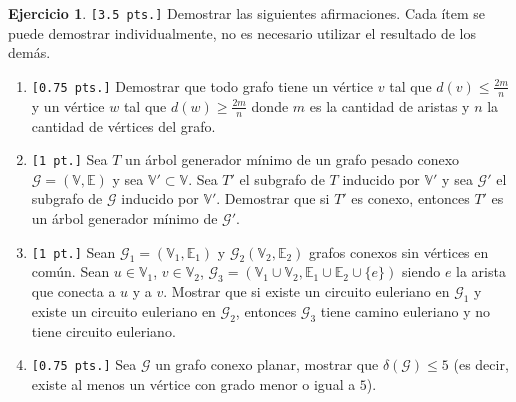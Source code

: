 \documentclass[a4paper,oneside,12pt]{amsart}
\theoremstyle{definition}
\newtheorem{quest}{Ejercicio}
\begin{document}
\begin{quest}\verb|[3.5 pts.]|
Demostrar las siguientes afirmaciones. Cada ítem se puede demostrar individualmente, no es necesario utilizar el
resultado de los demás.
\begin{enumerate}[label=\alph*)]
    \item \verb|[0.75 pts.]| Demostrar que todo grafo tiene un vértice $v$ tal que $d(v) \leq \frac{2m}{n}$ y un
    vértice $w$ tal que
    $d(w) \geq \frac{2m}{n}$ donde $m$ es la cantidad de aristas y $n$ la cantidad de vértices del grafo.
    \item \verb|[1 pt.]| Sea $T$ un árbol generador mínimo de un grafo pesado conexo
    $\mathcal{G}=(\mathbb{V}, \mathbb{E})$ y sea
    $\mathbb{V}'\subset \mathbb{V}$. Sea $T'$ el subgrafo de $T$ inducido por $\mathbb{V}'$ y sea $\mathcal{G}'$
    el subgrafo de $\mathcal{G}$ inducido por $\mathbb{V}'$. Demostrar que si $T'$ es conexo, entonces $T'$
    es un árbol generador mínimo de $\mathcal{G}'$.
    \item \verb|[1 pt.]| Sean $\mathcal{G}_1=(\mathbb{V}_1, \mathbb{E}_1)$ y $\mathcal{G}_2(\mathbb{V}_2, \mathbb{E}_2)$
    grafos conexos sin vértices en común. Sean $u\in \mathbb{V}_1$, $v\in \mathbb{V}_2$,
    $\mathcal{G}_3=(\mathbb{V}_1\cup \mathbb{V}_2, \mathbb{E}_1\cup \mathbb{E}_2\cup \{e\})$ siendo $e$
    la arista que conecta a $u$ y a $v$. Mostrar que si existe un circuito euleriano en $\mathcal{G}_1$
    y existe un circuito euleriano en $\mathcal{G}_2$, entonces $\mathcal{G}_3$
    tiene camino euleriano y no tiene circuito euleriano.
    \item \verb|[0.75 pts.]| Sea $\mathcal{G}$ un grafo conexo planar, mostrar que $\delta(\mathcal{G})\leq 5$
    (es decir, existe al menos un vértice con grado menor o igual a $5$).
\end{enumerate}
\end{quest}


\end{document}
